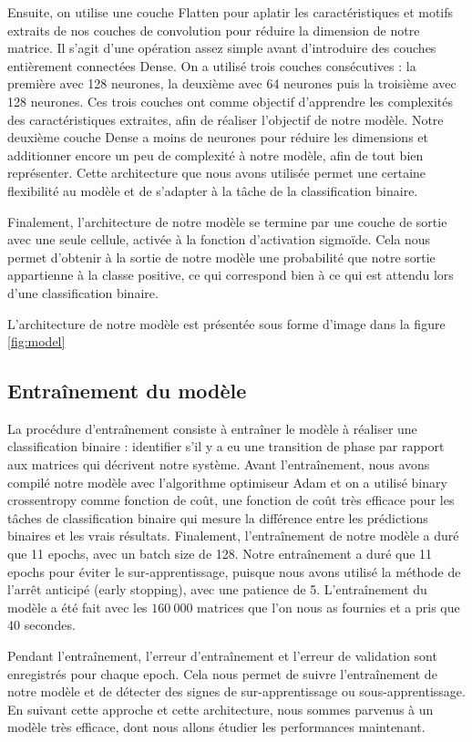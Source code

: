 \documentclass[11pt, parskip=half]{scrartcl} %
\begin{document}
Ensuite, on utilise une couche Flatten pour aplatir les caractéristiques et motifs extraits de nos couches de convolution pour réduire la dimension de notre matrice. Il s’agit d’une opération assez simple avant d’introduire des couches entièrement connectées Dense. On a utilisé trois couches consécutives : la première avec 128 neurones, la deuxième avec 64 neurones puis la troisième avec 128 neurones. Ces trois couches ont comme objectif d’apprendre les complexités des caractéristiques extraites, afin de réaliser l’objectif de notre modèle. Notre deuxième couche Dense a moins de neurones pour réduire les dimensions et additionner encore un peu de complexité à notre modèle, afin de tout bien représenter. Cette architecture que nous avons utilisée permet une certaine flexibilité au modèle et de s’adapter à la tâche de la classification binaire.

Finalement, l’architecture de notre modèle se termine par une couche de sortie avec une seule cellule, activée à la fonction d’activation sigmoïde. Cela nous permet d’obtenir à la sortie de notre modèle une probabilité que notre sortie appartienne à la classe positive, ce qui correspond bien à ce qui est attendu lors d’une classification binaire.

L’architecture de notre modèle est présentée sous forme d’image dans la figure \ref{fig:model}

\subsection{Entraînement du modèle}
La procédure d’entraînement consiste à entraîner le modèle à réaliser une classification binaire : identifier s’il y a eu une transition de phase par rapport aux matrices qui décrivent notre système. Avant l’entraînement, nous avons compilé notre modèle avec l’algorithme optimiseur Adam et on a utilisé binary crossentropy comme fonction de coût, une fonction de coût très efficace pour les tâches de classification binaire qui mesure la différence entre les prédictions binaires et les vrais résultats. Finalement, l’entraînement de notre modèle a duré que 11 epochs, avec un batch size de 128. Notre entraînement a duré que 11 epochs pour éviter le sur-apprentissage, puisque nous avons utilisé la méthode de l’arrêt anticipé (early stopping), avec une patience de 5. L’entraînement du modèle a été fait avec les $160 \ 000$ matrices que l'on nous as fournies et a pris que 40 secondes.

Pendant l’entraînement, l’erreur d’entraînement et l’erreur de validation sont enregistrés pour chaque epoch. Cela nous permet de suivre l’entraînement de notre modèle et de détecter des signes de sur-apprentissage ou sous-apprentissage. En suivant cette approche et cette architecture, nous sommes parvenus à un modèle très efficace, dont nous allons étudier les performances maintenant.
\end{document}
